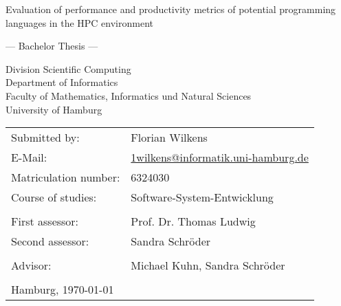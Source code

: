 \begin{titlepage}
    \begin{center}
        {\titlefont\huge Evaluation of performance and productivity metrics of
            potential programming languages in the HPC environment \par}

        \bigskip
        \bigskip

        {\titlefont\Large --- Bachelor Thesis ---\par}

        \bigskip
        \bigskip

        {\large Division Scientific Computing \\
        Department of Informatics \\
        Faculty of Mathematics, Informatics und Natural Sciences \\
        University of Hamburg\par}
    \end{center}

    \vfill

    {\large \begin{tabular}{ll}
        Submitted by: & Florian Wilkens \\
        E-Mail: & \href{mailto:1wilkens@informatik.uni-hamburg.de}
            {1wilkens@informatik.uni-hamburg.de} \\
        Matriculation number: & 6324030 \\
        Course of studies: & Software-System-Entwicklung \\
        \\
        First assessor: & Prof. Dr. Thomas Ludwig \\
        Second assessor: & Sandra Schr\"oder \\ \\
        Advisor: & Michael Kuhn, Sandra Schr\"oder \\
        \\
        Hamburg, \today
    \end{tabular}\par}
\end{titlepage}
